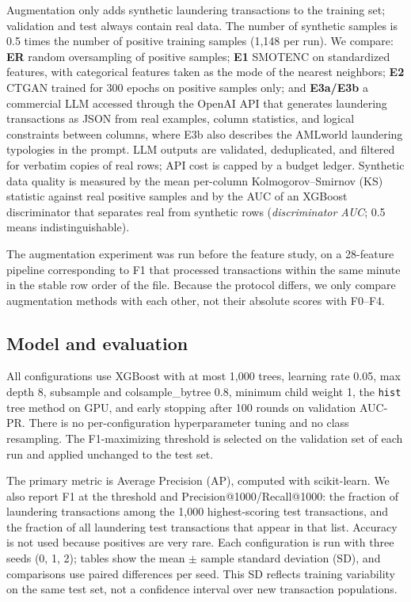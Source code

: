 \documentclass[sigconf,nonacm]{acmart}
\begin{document}
Augmentation only adds synthetic laundering transactions to the training set; validation and test always contain
real data. The number of synthetic samples is 0.5 times the number of positive training samples (1,148 per run). We
compare: \textbf{ER} random oversampling of positive samples; \textbf{E1} SMOTENC on standardized features, with
categorical features taken as the mode of the nearest neighbors; \textbf{E2} CTGAN trained for 300 epochs on positive
samples only; and \textbf{E3a/E3b} a commercial LLM accessed through the OpenAI API that generates laundering
transactions as JSON from real examples, column statistics, and logical constraints between columns, where E3b also
describes the AMLworld laundering typologies in the prompt. LLM outputs are validated, deduplicated, and filtered
for verbatim copies of real rows; API cost is capped by a budget ledger. Synthetic data quality is measured by the
mean per-column Kolmogorov--Smirnov (KS) statistic against real positive samples and by the AUC of an XGBoost
discriminator that separates real from synthetic rows (\emph{discriminator AUC}; 0.5 means indistinguishable).

The augmentation experiment was run before the feature study, on a 28-feature pipeline corresponding to F1 that
processed transactions within the same minute in the stable row order of the file. Because the protocol differs, we
only compare augmentation methods with each other, not their absolute scores with F0--F4.

\subsection{Model and evaluation}

All configurations use XGBoost with at most 1,000 trees, learning rate 0.05, max depth 8, subsample and
colsample\_bytree 0.8, minimum child weight 1, the \texttt{hist} tree method on GPU, and early stopping after 100
rounds on validation AUC-PR. There is no per-configuration hyperparameter tuning and no class resampling. The
F1-maximizing threshold is selected on the validation set of each run and applied unchanged to the test set.

The primary metric is Average Precision (AP), computed with scikit-learn. We also report F1 at the threshold and
Precision@1000/Recall@1000: the fraction of laundering transactions among the 1,000 highest-scoring test
transactions, and the fraction of all laundering test transactions that appear in that list. Accuracy is not used
because positives are very rare. Each configuration is run with three seeds (0, 1, 2); tables show the mean $\pm$
sample standard deviation (SD), and comparisons use paired differences per seed. This SD reflects training
variability on the same test set, not a confidence interval over new transaction populations.
\end{document}
